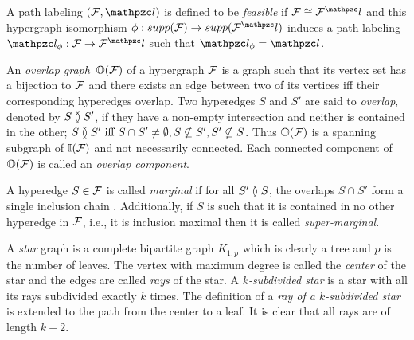 \documentclass[MS]             %
              {iitmdiss_as}    %
\begin{document}
A path labeling $(\cF, \cl)$ is defined to be {\em
  feasible} if
$\cF \cong \cF^\cl$ and this hypergraph isomorphism $\phi: supp(\cF)
\rightarrow supp(\cF^\cl)$ induces a path labeling $\cl_\phi: \cF
\rightarrow \cF^\cl$ such that $\cl_\phi = \cl$. 

An {\em overlap graph}\, $\mathbb O({\cal F})$ of a hypergraph ${\cal F}$ is
a graph such that its vertex set has a bijection to ${\cal F}$ and there
exists an edge between two of its vertices iff their corresponding
hyperedges overlap. Two hyperedges $S$ and $S'$ are said to {\em
  overlap}, denoted by $S \between S'$, if they have a non-empty
intersection and neither is contained in the other; $S \between S'
\text{ iff } S \cap S' \ne \emptyset, S \nsubseteq S', S' \nsubseteq
S$. Thus $\mathbb O({\cal F})$ is a spanning subgraph of $\mathbb I({\cal F})$ and not
necessarily connected. Each connected component of $\mathbb O({\cal F})$ is
called an {\em overlap component}.


A hyperedge $S \in {\cal F}$ is called {\em marginal} if for all $S'
\between S$, the overlaps $S \cap S'$ form a single inclusion chain
\cite{kklv10}. Additionally, if $S$ is such that it is contained in no
other hyperedge in ${\cal F}$, i.e., it is inclusion maximal then it is called
{\em super-marginal}.

A {\em star} graph is a complete bipartite graph $K_{1,p}$
which is clearly a tree and $p$ is the number of leaves. The vertex
with maximum degree is called the {\em center} of the star and the
edges are called {\em rays} of the star. A {\em $k$-subdivided star}
is a star with all its rays subdivided exactly $k$ times. The
definition of a {\em ray of a $k$-subdivided star} is extended to the path
from the center to a leaf. It is clear that all rays are of length $k+2$.
\end{document}
